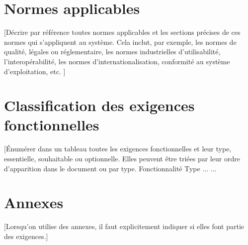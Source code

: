 \documentclass[10pt,a4paper]{report}
\begin{document}
\section{Normes applicables}
[Décrire par référence toutes normes applicables et les sections précises de ces normes qui s’appliquent au système. Cela inclut, par exemple, les normes de qualité, légales ou réglementaire, les normes industrielles d’utilisabilité, l’interopérabilité, les normes d’internationalisation, conformité au système d’exploitation, etc. ]


\section{Classification des exigences fonctionnelles}
[Énumérer dans un tableau toutes les exigences fonctionnelles et leur type, essentielle, souhaitable ou optionnelle. Elles peuvent être triées par leur ordre d’apparition dans le document ou par type.
Fonctionnalité	Type
...	
...	


\section{Annexes}
[Lorsqu’on utilise des annexes, il faut explicitement indiquer si elles font partie des exigences.]
\end{document}
